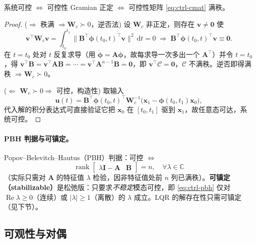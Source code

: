 \begin{theorem}
\label{thm:ctrl-gramian-rank}
系统可控 $\iff$ 可控性 Gramian 正定 $\iff$ 可控性矩阵 \cref{eq:ctrl-cmat} 满秩。
\end{theorem}
\begin{proof}
($\Rightarrow$ 秩满 $\Rightarrow\mathbf{W}_c\succ0$，逆否法) 设 $\mathbf{W}_c$ 非正定，则存在 $\mathbf{v}\neq\mathbf{0}$ 使
\[
  \mathbf{v}^\top\mathbf{W}_c\mathbf{v}=\int_{t_0}^{t_1}\big\|\mathbf{B}^\top\boldsymbol{\phi}(t_0,t)^\top\mathbf{v}\big\|^2\,\mathrm dt=0\;\Rightarrow\;\mathbf{B}^\top\boldsymbol{\phi}(t_0,t)^\top\mathbf{v}\equiv\mathbf{0}.
\]
在 $t=t_0$ 处对 $t$ 反复求导（用 $\dot{\boldsymbol{\phi}}=\mathbf{A}\boldsymbol{\phi}$，故每求导一次多出一个 $\mathbf{A}^\top$）并令 $t=t_0$，得 $\mathbf{v}^\top\mathbf{B}=\mathbf{v}^\top\mathbf{A}\mathbf{B}=\cdots=\mathbf{v}^\top\mathbf{A}^{n-1}\mathbf{B}=\mathbf{0}$，即 $\mathbf{v}^\top\mathcal{C}=\mathbf{0}$，$\mathcal{C}$ 不满秩。逆否即得满秩 $\Rightarrow\mathbf{W}_c\succ0$。

($\Leftarrow$ $\mathbf{W}_c\succ0\Rightarrow$ 可控，构造性) 取输入
\[
  \mathbf{u}(t)=\mathbf{B}^\top\boldsymbol{\phi}(t_0,t)^\top\mathbf{W}_c^{-1}\big(\mathbf{x}_1-\boldsymbol{\phi}(t_0,t_1)\mathbf{x}_0\big),
\]
代入解的积分表达式可直接验证它把 $\mathbf{x}_0$ 在 $[t_0,t_1]$ 驱到 $\mathbf{x}_1$，故任意态可达，系统可控。
\end{proof}

\paragraph{PBH 判据与可镇定。}
Popov--Belevitch--Hautus（PBH）判据\cite{rawlings2020mpc}：可控 $\iff$
\begin{equation}
  \operatorname{rank}\begin{bmatrix}\lambda\mathbf{I}-\mathbf{A}&\mathbf{B}\end{bmatrix}=n,\quad\forall\lambda\in\mathbb{C}
  \label{eq:ctrl-pbh}
\end{equation}
（实际只需对 $\mathbf{A}$ 的特征值 $\lambda$ 检验，因非特征值处前 $n$ 列已满秩）。\textbf{可镇定（stabilizable）}是松弛版：只要求\emph{不稳定}模态可控，即 \cref{eq:ctrl-pbh} 仅对 $\operatorname{Re}\lambda\ge0$（连续）或 $|\lambda|\ge1$（离散）的 $\lambda$ 成立。LQR 的解存在性只需可镇定（见下节）。

\subsection{可观性与对偶}
\label{sec:ctrl-observability}

